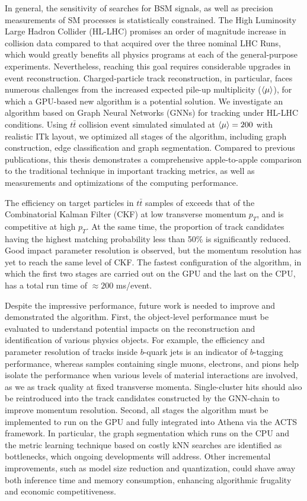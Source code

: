 In general, the sensitivity of searches for BSM signals, as well as precision measurements of SM processes is statistically constrained. 
The High Luminosity Large Hadron Collider (HL-LHC) promises an order of magnitude increase in collision data compared to that acquired over the three nominal LHC Runs, which would greatly benefits all physics programs at each of the general-purpose experiments.
Nevertheless, reaching this goal requires considerable upgrades in event reconstruction.
Charged-particle track reconstruction, in particular, faces numerous challenges from the increased expected pile-up multiplicity ($\expval{\mu}$), for which a GPU-based new algorithm is a potential solution. 
We investigate an algorithm based on Graph Neural Networks (GNNs) for tracking under HL-LHC conditions.
Using $t\bar{t}$ collision event simulated simulated at $\expval{\mu}=200$ with realistic ITk layout, we optimized all stages of the algorithm, including graph construction, edge classification and graph segmentation. 
Compared to previous publications, this thesis demonstrates a comprehensive apple-to-apple comparison to the traditional technique in important tracking metrics, as well as measurements and optimizations of the computing performance.

The efficiency on target particles in $t\bar{t}$ samples of exceeds that of the Combinatorial Kalman Filter (CKF) at low transverse momentum $p_T$, and is competitive at high $p_T$.
At the same time, the proportion of track candidates having the highest matching probability less than 50\% is significantly reduced. 
Good impact parameter resolution is observed, but the momentum resolution has yet to reach the same level of CKF. 
The fastest configuration of the algorithm, in which the first two stages are carried out on the GPU and the last on the CPU, has a total run time of $\approx 200$ ms/event.

Despite the impressive performance, future work is needed to improve and demonstrated the algorithm. 
First, the object-level performance must be evaluated to understand potential impacts on the reconstruction and identification of various physics objects. 
For example, the efficiency and parameter resolution of tracks inside $b$-quark jets is an indicator of $b$-tagging performance, whereas samples containing single muons, electrons, and pions help isolate the performance when various levels of material interactions are involved, as we as track quality at fixed transverse momenta.
Single-cluster hits should also be reintroduced into the track candidates constructed by the GNN-chain to improve momentum resolution.
Second, all stages the algorithm must be implemented to run on the GPU and fully integrated into Athena via the ACTS framework. 
In particular, the graph segmentation which runs on the CPU and the metric learning technique based on costly kNN searches are identified as bottlenecks, which ongoing developments will address. 
Other incremental improvements, such as model size reduction and quantization, could shave away both inference time and memory consumption, enhancing algorithmic frugality and economic competitiveness. 
